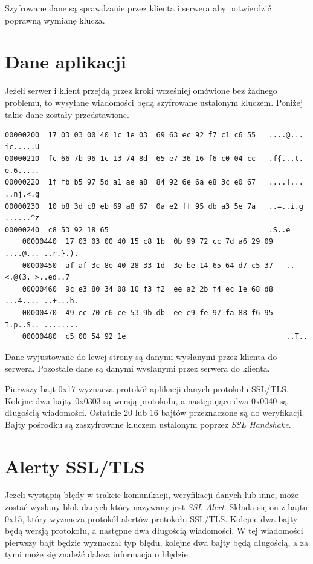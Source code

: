 \documentclass[12pt,twoside,a4]{mwbk}
\theoremstyle{definition}
\begin{document}
Szyfrowane dane są sprawdzanie przez klienta i serwera aby potwierdzić poprawną wymianę klucza.

\section{Dane aplikacji}
Jeżeli serwer i klient przejdą przez kroki wcześniej omówione bez żadnego problemu, to wysyłane wiadomości będą szyfrowane ustalonym kluczem. Poniżej takie dane zostały przedstawione.

\begin{lstlisting}[keywordstyle=\color{Black},
  commentstyle=\color{Black},
  stringstyle=\color{Black},
  identifierstyle=\color{Black}]
00000200  17 03 03 00 40 1c 1e 03  69 63 ec 92 f7 c1 c6 55   ....@... ic.....U
00000210  fc 66 7b 96 1c 13 74 8d  65 e7 36 16 f6 c0 04 cc   .f{...t. e.6.....
00000220  1f fb b5 97 5d a1 ae a8  84 92 6e 6a e8 3c e0 67   ....]... ..nj.<.g
00000230  10 b8 3d c8 eb 69 a8 67  0a e2 ff 95 db a3 5e 7a   ..=..i.g ......^z
00000240  c8 53 92 18 65                                     .S..e
    00000440  17 03 03 00 40 15 c8 1b  0b 99 72 cc 7d a6 29 09   ....@... ..r.}.).
    00000450  af af 3c 8e 40 28 33 1d  3e be 14 65 64 d7 c5 37   ..<.@(3. >..ed..7
    00000460  9c e3 80 34 08 10 f3 f2  ee a2 2b f4 ec 1e 68 d8   ...4.... ..+...h.
    00000470  49 ec 70 e6 ce 53 9b db  ee e9 fe 97 fa 88 f6 95   I.p..S.. ........
    00000480  c5 00 54 92 1e                                     ..T..
\end{lstlisting}

Dane wyjustowane do lewej strony są danymi wysłanymi przez klienta do serwera. Pozostałe dane są danymi wysłanymi przez serwera do klienta. \\ \par
Pierwszy bajt 0x17 wyznacza protokół aplikacji danych protokołu SSL/TLS. Kolejne dwa bajty 0x0303 są wersją protokołu, a następujące dwa 0x0040 są długością wiadomości. Ostatnie 20 lub 16 bajtów przeznaczone są do weryfikacji. Bajty pośrodku są zaszyfrowane kluczem ustalonym poprzez \textit{SSL Handshake}.

\section{Alerty SSL/TLS}
Jeżeli wystąpią błędy w trakcie komunikacji, weryfikacji danych lub inne, może zostać wysłany blok danych który nazywany jest \textit{SSL Alert}. Składa się on z bajtu 0x15, który wyznacza protokół alertów protokołu SSL/TLS. Kolejne dwa bajty będą wersją protokołu, a następne dwa długością wiadomości. W tej wiadomości pierwszy bajt będzie wyznaczał typ błędu, kolejne dwa bajty będą długością, a za tymi może się znaleźć dalsza informacja o błędzie.
\end{document}
